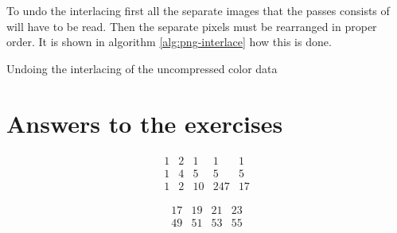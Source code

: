 To undo the interlacing first all the separate images that the passes
consists of will have to be read. Then the separate pixels must be
rearranged in proper order. It is shown in algorithm
\ref{alg:png-interlace} how this is done.

\begin{algorithm}[H]
  \caption{Undoing the interlacing of the uncompressed \png color data}
  \label{alg:png-interlace}
  \begin{algorithmic}[1]








    \EndWhile


    \EndWhile

    \EndForTo

  \end{algorithmic}
\end{algorithm}



\section{Answers to the exercises}

\begin{Answer}[ref={filter-1}]

  \[
  \begin{matrix}
    1 & 2 & 1 & 1 & 1 \\
    1 & 4 & 5 & 5 & 5 \\
    1 & 2 & 10 & 247 & 17
  \end{matrix}
  \]

\end{Answer}

\begin{Answer}[ref={ex-interlace}]

  \[
  \begin{matrix}
    17 & 19 & 21 & 23 \\
    49 & 51 & 53 & 55
  \end{matrix}
  \]


\end{Answer}



